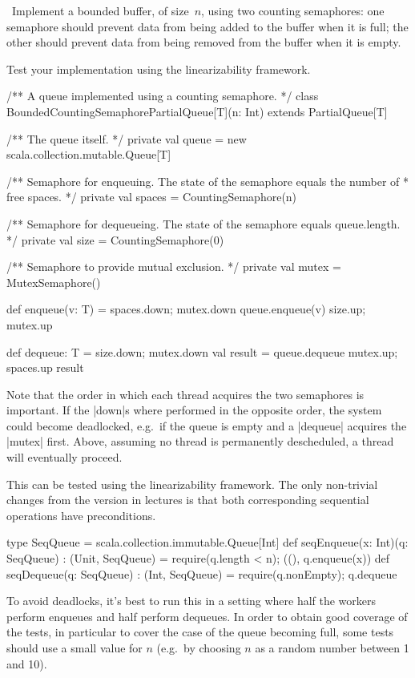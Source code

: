 \begin{question}
\Programming\ Implement a bounded buffer, of size~$n$, using two counting
semaphores: one semaphore should prevent data from being added to the buffer
when it is full; the other should prevent data from being removed from the
buffer when it is empty.

Test your implementation using the linearizability framework. 
\end{question}


\begin{answer}
\begin{scala}
/** A queue implemented using a counting semaphore. */
class BoundedCountingSemaphorePartialQueue[T](n: Int) extends PartialQueue[T]{
  /** The queue itself. */
  private val queue = new scala.collection.mutable.Queue[T]

  /** Semaphore for enqueuing.  The state of the semaphore equals the number of
    * free spaces. */
  private val spaces = CountingSemaphore(n)

  /** Semaphore for dequeueing.  The state of the semaphore equals queue.length. */
  private val size = CountingSemaphore(0)

  /** Semaphore to provide mutual exclusion. */
  private val mutex = MutexSemaphore()

  def enqueue(v: T) = {
    spaces.down; mutex.down
    queue.enqueue(v)
    size.up; mutex.up
  }

  def dequeue: T = {
    size.down; mutex.down
    val result = queue.dequeue
    mutex.up; spaces.up
    result
  }
}
\end{scala}
%
Note that the order in which each thread acquires the two semaphores is
important.  If the |down|s where performed in the opposite order, the system
could become deadlocked, e.g.~if the queue is empty and a |dequeue| acquires
the |mutex| first.  Above, assuming no thread is permanently descheduled, a
thread will eventually proceed. 

This can be tested using the linearizability framework.  The only non-trivial
changes from the version in lectures is that both corresponding sequential
operations have preconditions.
\begin{scala}
  type SeqQueue = scala.collection.immutable.Queue[Int]
  def seqEnqueue(x: Int)(q: SeqQueue) : (Unit, SeqQueue) = {
    require(q.length < n); ((), q.enqueue(x))
  }
  def seqDequeue(q: SeqQueue) : (Int, SeqQueue) = {
    require(q.nonEmpty); q.dequeue
  }
\end{scala}
%
To avoid deadlocks, it's best to run this in a setting where half the workers
perform enqueues and half perform dequeues.  In order to obtain good coverage
of the tests, in particular to cover the case of the queue becoming full, some
tests should use a small value for $n$ (e.g.~by choosing $n$ as a random
number between 1 and 10).
\end{answer}
